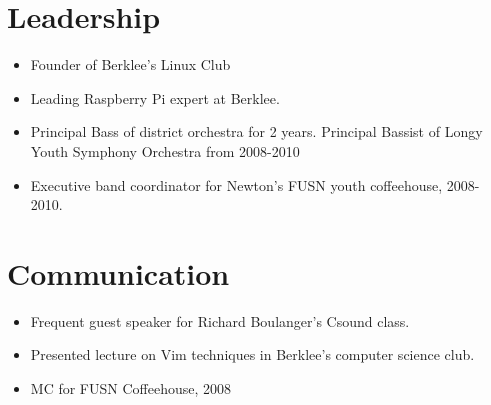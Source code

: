 \documentclass[margin]{res}
\begin{document}
\begin{resume}
\normalsize{\section{Leadership}}
	           \begin{itemize} \itemsep -2pt %
                   \item Founder of Berklee's Linux Club
                   \item Leading Raspberry Pi expert at Berklee.
                  \item Principal Bass of district orchestra for 2 years. Principal
Bassist of Longy Youth Symphony Orchestra from 2008-2010
                   \item Executive band coordinator for Newton's FUSN youth coffeehouse, 
2008-2010.
                   \end{itemize}
\normalsize{\section{Communication}} 
                  \begin{itemize} \itemsep -2pt
                  \item Frequent guest speaker for Richard Boulanger's Csound 
class.
                  \item  Presented lecture on Vim techniques in Berklee's computer
science club.
                  \item  MC for FUSN Coffeehouse, 2008
                  \end{itemize} 
 

\end{resume}
\end{document}
